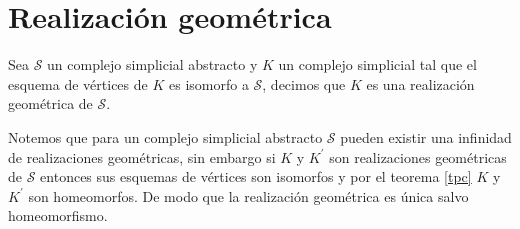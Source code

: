 \section{Realización geométrica}
\begin{Defi}
Sea $\mathcal{S}$ un complejo simplicial abstracto y $K$ un complejo simplicial tal que el esquema de vértices de $K$ es isomorfo a $\mathcal{S}$, decimos que $K$ es una realización geométrica de $\mathcal{S}$.
\end{Defi}
Notemos que para un complejo simplicial abstracto $\mathcal{S}$ pueden existir una infinidad de realizaciones geométricas, sin embargo si $K$ y $K^{'}$ son realizaciones geométricas de $\mathcal{S}$ entonces sus esquemas de vértices son isomorfos y por el teorema \ref{tpc} $K$ y $K^{'}$ son homeomorfos. De modo que la realización geométrica es única salvo homeomorfismo.


